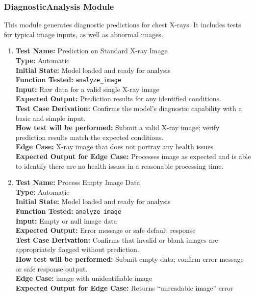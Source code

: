 \documentclass[12pt, titlepage]{article}
\begin{document}
\subsubsection{DiagnosticAnalysis Module}
This module generates diagnostic predictions for chest X-rays. It includes tests for typical image inputs, as well as abnormal images.
\begin{enumerate}
  \item \textbf{Test Name:}  Prediction on Standard X-ray Image\\
    \textbf{Type:}  Automatic\\
    \textbf{Initial State:}  Model loaded and ready for analysis\\
    \textbf{Function Tested:}  \verb|analyze_image|\\
    \textbf{Input:}  Raw data for a valid single X-ray image\\
    \textbf{Expected Output:}  Prediction results for any identified conditions.\\
    \textbf{Test Case Derivation:}  Confirms the model’s diagnostic capability with a basic and simple input.\\
    \textbf{How test will be performed:}  Submit a valid X-ray image; verify prediction results match the expected conditions.\\
    \textbf{Edge Case:}  X-ray image that does not portray any health issues\\
    \textbf{Expected Output for Edge Case:}  Processes image as expected and is able to identify there are no health issues in a reasonable processing time.\\

  \item \textbf{Test Name:}  Process Empty Image Data\\
    \textbf{Type:}  Automatic\\
    \textbf{Initial State:}  Model loaded and ready for analysis\\
    \textbf{Function Tested:}  \verb|analyze_image|\\
    \textbf{Input:}  Empty or null image data\\
    \textbf{Expected Output:}  Error message or safe default response\\
    \textbf{Test Case Derivation:}  Confirms that invalid or blank images are appropriately flagged without prediction.\\
    \textbf{How test will be performed:}  Submit empty data; confirm error message or safe response output.\\
    \textbf{Edge Case:}  image with unidentifiable image\\
    \textbf{Expected Output for Edge Case:}  Returns “unreadable image” error\\
\end{enumerate}
\end{document}
